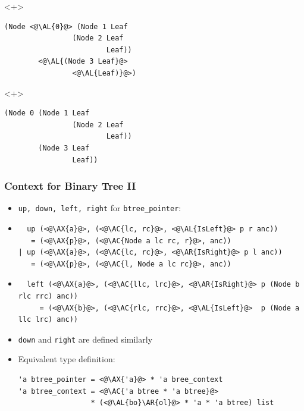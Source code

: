 \begin{frame}[fragile]
\begin{itemize}
\begin{itemize}
\begin{onlyenv}<+>
\begin{lstlisting}
(Node <@\AL{0}@> (Node 1 Leaf
                (Node 2 Leaf
                        Leaf))
        <@\AL{(Node 3 Leaf}@>
                <@\AL{Leaf)}@>)
\end{lstlisting}
\end{onlyenv}

\begin{onlyenv}<+>
\color{gray}
\begin{lstlisting}
(Node 0 (Node 1 Leaf
                (Node 2 Leaf
                        Leaf))
        (Node 3 Leaf
                Leaf))
\end{lstlisting}
\end{onlyenv}
\end{itemize}

\end{itemize}
\end{frame}

\begin{frame}[fragile]
\frametitle{Context for Binary Tree II}

\newcommand{\AX}[1]{\textcolor{red}{#1}}
\newcommand{\AC}[1]{\textcolor{blue}{#1}}
\newcommand{\AL}[1]{\textcolor[RGB]{0,170,0}{#1}}
\newcommand{\AR}[1]{\textcolor{cyan}{#1}}
\newcommand{\AT}[1]{\textcolor{gray}{#1}}

\begin{itemize}
\item \lstinline|up, down, left, right| for \lstinline|btree_pointer|:

\item
\begin{lstlisting}
  up (<@\AX{a}@>, (<@\AC{lc, rc}@>, <@\AL{IsLeft}@> p r anc))
   = (<@\AX{p}@>, (<@\AC{Node a lc rc, r}@>, anc))
| up (<@\AX{a}@>, (<@\AC{lc, rc}@>, <@\AR{IsRight}@> p l anc))
   = (<@\AX{p}@>, (<@\AC{l, Node a lc rc}@>, anc))
\end{lstlisting}

\item
\begin{lstlisting}
  left (<@\AX{a}@>, (<@\AC{llc, lrc}@>, <@\AR{IsRight}@> p (Node b rlc rrc) anc))
     = (<@\AX{b}@>, (<@\AC{rlc, rrc}@>, <@\AL{IsLeft}@>  p (Node a llc lrc) anc))
\end{lstlisting}

\item \lstinline|down| and \lstinline|right| are defined similarly

\item Equivalent type definition:\\
\begin{lstlisting}
'a btree_pointer = <@\AX{'a}@> * 'a bree_context
'a btree_context = <@\AC{'a btree * 'a btree}@>
                 * (<@\AL{bo}\AR{ol}@> * 'a * 'a btree) list
\end{lstlisting}
\end{itemize}
\end{frame}

